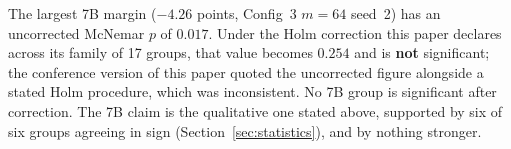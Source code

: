 The largest 7B margin ($-4.26$ points, Config~3 $m{=}64$ seed~2) has an
uncorrected McNemar $p$ of $0.017$. Under the Holm correction this paper
declares across its family of 17 groups, that value becomes $0.254$ and is
\textbf{not} significant; the conference version of this paper quoted the
uncorrected figure alongside a stated Holm procedure, which was inconsistent.
No 7B group is significant after correction. The 7B claim is the qualitative
one stated above, supported by six of six groups agreeing in sign
(Section~\ref{sec:statistics}), and by nothing stronger.
